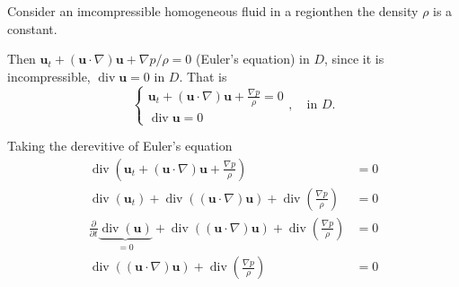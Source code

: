 
Consider an imcompressible homogeneous fluid in a regionthen the density  $\rho$ is a constant.

Then $\displaystyle \textbf{u}_t + (\textbf{u} \cdot \nabla ) \textbf{u} + \nabla p/\rho = 0$ (Euler's equation) in $D$, since it is incompressible, $\operatorname{div}\textbf{u} = 0$ in $D$​​. That is
\begin{equation}
\begin{cases}
\displaystyle \textbf{u}_t + (\textbf{u} \cdot \nabla ) \textbf{u} + \frac{\nabla p}{\rho} = 0\\
\operatorname{div} \textbf{u} = 0
\end{cases},\quad\text{in $D$}.
\end{equation}



Taking the derevitive of Euler's equation
\begin{equation}
\begin{aligned}
\operatorname{div}\left(\textbf{u}_t + (\textbf{u} \cdot \nabla) \textbf{u} + \frac{\nabla p}{\rho} \right) &= 0\\
\operatorname{div}(\textbf{u}_t) + \operatorname{div}\left((\textbf{u} \cdot \nabla) \textbf{u}\right) + \operatorname{div}\left(\frac{\nabla p}{\rho}\right) &= 0\\
\frac{\partial}{\partial t}\underbrace{\operatorname{div}(\textbf{u})}_{=0} + \operatorname{div}\left((\textbf{u} \cdot \nabla) \textbf{u}\right) + \operatorname{div}\left(\frac{\nabla p}{\rho}\right) &= 0\\
\operatorname{div}\left((\textbf{u} \cdot \nabla) \textbf{u}\right) + \operatorname{div}\left(\frac{\nabla p}{\rho}\right) &= 0\\
\end{aligned}
\end{equation}



